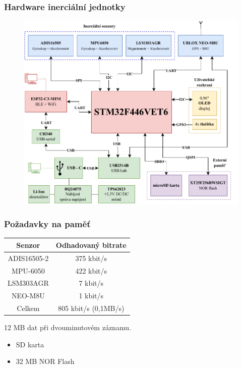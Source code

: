 \documentclass[%
  12pt,       				%
	t,                  %
	aspectratio=1610,   %
	unicode,						%
]{beamer}				    	%
\begin{document}
\begin{frame} 
	\frametitle{Hardware inerciální jednotky}
	
			\begin{figure}%
				\centering
				
				\includegraphics[width=0.62\columnwidth]{obrazky/IMUnav_H00_block}
			\end{figure}
	
\end{frame} 




\begin{frame} 
	\frametitle{Požadavky na paměť}
	\begin{table}[h!]
\centering
\begin{tabular}{c|c}

Senzor & Odhadovaný bitrate \\ 
\hline 
\hline 
ADIS16505-2 & 375 kbit/s \\ 

MPU-6050 & 422 kbit/s \\ 

LSM303AGR & 7 kbit/s \\ 

NEO-M8U & 1 kbit/s \\ 
\hline

Celkem & 805 kbit/s (0,1MB/s) \\ 

\end{tabular} 
\label{table:memoryBW}
\end{table} 
	
	12 MB dat při dvouminutovém záznamu.
	
	\begin{itemize}
	\item SD karta
	\item 32 MB NOR Flash
	\end{itemize}
	
\end{frame} 
\end{document}
